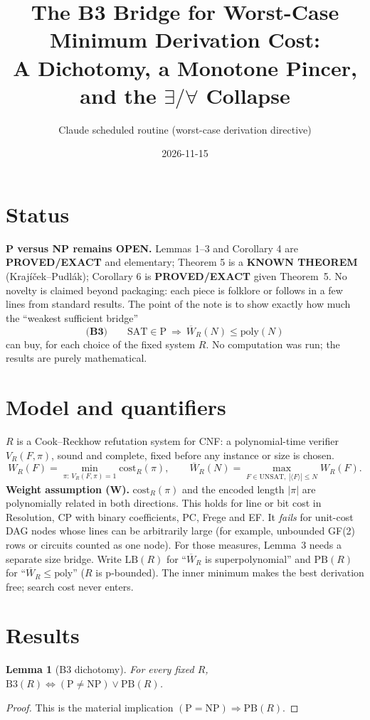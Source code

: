 \documentclass[11pt]{article}
\title{The B3 Bridge for Worst-Case Minimum Derivation Cost:\\
A Dichotomy, a Monotone Pincer, and the $\exists/\forall$ Collapse}
\author{Claude scheduled routine (worst-case derivation directive)}
\date{2026-11-15}
\newtheorem{lemma}[theorem]{Lemma}
\theoremstyle{definition}
\newcommand{\Wbar}{\overline W}
\begin{document}
\maketitle

\section*{Status}
\textbf{P versus NP remains OPEN.} Lemmas 1--3 and Corollary 4 are
\textbf{PROVED/EXACT} and elementary; Theorem 5 is a \textbf{KNOWN THEOREM}
(Krajíček--Pudlák); Corollary 6 is \textbf{PROVED/EXACT} given Theorem~5.
No novelty is claimed beyond packaging: each piece is folklore or follows in a
few lines from standard results. The point of the note is to show exactly how
much the ``weakest sufficient bridge''
\[
\textbf{(B3)}\qquad \mathrm{SAT}\in\mathrm P\ \Longrightarrow\ \Wbar_R(N)\le\mathrm{poly}(N)
\]
can buy, for each choice of the fixed system $R$. No computation was run;
the results are purely mathematical.

\section*{Model and quantifiers}
$R$ is a Cook--Reckhow refutation system for CNF: a polynomial-time verifier
$V_R(F,\pi)$, sound and complete, fixed before any instance or size is chosen.
\[
W_R(F)=\min_{\pi:\,V_R(F,\pi)=1}\mathrm{cost}_R(\pi),\qquad
\Wbar_R(N)=\max_{F\in\mathrm{UNSAT},\ |\langle F\rangle|\le N}W_R(F).
\]
\textbf{Weight assumption (W).} $\mathrm{cost}_R(\pi)$ and the encoded length
$|\pi|$ are polynomially related in both directions. This holds for line or
bit cost in Resolution, CP with binary coefficients, PC, Frege and EF. It
\emph{fails} for unit-cost DAG nodes whose lines can be arbitrarily large
(for example, unbounded GF(2) rows or circuits counted as one node). For those
measures, Lemma~3 needs a separate size bridge.
Write $\mathrm{LB}(R)$ for ``$\Wbar_R$ is superpolynomial'' and $\mathrm{PB}(R)$
for ``$\Wbar_R\le\mathrm{poly}$'' ($R$ is p-bounded).
The inner minimum makes the best derivation free; search cost never enters.

\section{Results}

\begin{lemma}[B3 dichotomy]\label{l:dich}
For every fixed $R$, $\mathrm{B3}(R)\iff(\mathrm P\ne\mathrm{NP})\vee\mathrm{PB}(R)$.
\end{lemma}
\begin{proof}
This is the material implication $(\mathrm P=\mathrm{NP})\Rightarrow\mathrm{PB}(R)$.
\end{proof}
\end{document}
